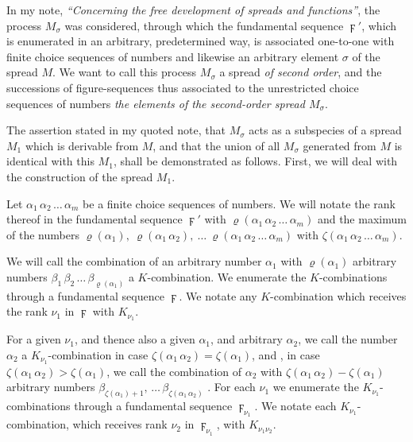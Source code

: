 \documentclass{amsart}
\newcommand\Rank[1]{\varrho\left(#1\right)}
\newcommand\Max[1]{\zeta\left(#1\right)}
\begin{document}


In my note, \emph{``Concerning the free development of spreads and
functions''}, the process $M_\sigma$ was considered, through which
the fundamental sequence $\digamma'$, which is enumerated in an arbitrary,
predetermined way, is associated one-to-one with finite choice sequences of
numbers and likewise an arbitrary element $\sigma$ of the spread $M$. We want to call this process $M_\sigma$ a
spread \emph{of second order}, and the successions of figure-sequences thus
associated to the unrestricted choice sequences of numbers  \emph{the elements of the second-order spread $M_\sigma$}.

The assertion stated in my quoted note, that $M_\sigma$ acts as a subspecies of
a spread $M_1$ which is derivable from $M$, and that the union of all
$M_\sigma$ generated from $M$ is identical with this $M_1$, shall be
demonstrated as follows. First, we will deal with the construction of the
spread $M_1$.

Let $\alpha_1\, \alpha_2\, \dots\, \alpha_m$ be a finite choice sequences of
numbers. We will notate the rank thereof in the fundamental sequence
$\digamma'$ with $\Rank{\alpha_1\,\alpha_2\,\dots\,\alpha_m}$ and the maximum
of the numbers $\Rank{\alpha_1},\ \Rank{\alpha_1\,\alpha_2},\ \dots\
\Rank{\alpha_1\,\alpha_2\,\dots\,\alpha_m}$ with
$\Max{\alpha_1\,\alpha_2\,\dots\,\alpha_m}$.

We will call the combination of an arbitrary number $\alpha_1$ with
$\Rank{\alpha_1}$ arbitrary numbers
$\beta_1\,\beta_2\,\dots\,\beta_{\Rank{\alpha_1}}$ a $K$-combination. We
enumerate the $K$-combinations through a fundamental sequence $\digamma$. We
notate any $K$-combination which receives the rank $\nu_1$ in $\digamma$ with
$K_{\nu_1}$.

For a given $\nu_1$, and thence also a given $\alpha_1$, and arbitrary
$\alpha_2$, we call the number $\alpha_2$ a $K_{\nu_1}$-combination in case
$\Max{\alpha_1\,\alpha_2} = \Max{\alpha_1}$, and \EdMark{likewise}, in case
$\Max{\alpha_1\,\alpha_2} > \Max{\alpha_1}$, we call the combination of
$\alpha_2$ with $\Max{\alpha_1\,\alpha_2} - \Max{\alpha_1}$ arbitrary numbers
$\beta_{\Max{\alpha_1}+1},\,\dots\,\beta_{\Max{\alpha_1\,\alpha_2}}$ \EdMark{a
$K_{\nu_1}$-combination}. For each $\nu_1$ we enumerate the
$K_{\nu_1}$-combinations through a fundamental sequence $\digamma_{\nu_1}$. We
notate each $K_{\nu_1}$-combination, which receives rank $\nu_2$ in
$\digamma_{\nu_1}$, with $K_{\nu_1\nu_2}$.
\end{document}
